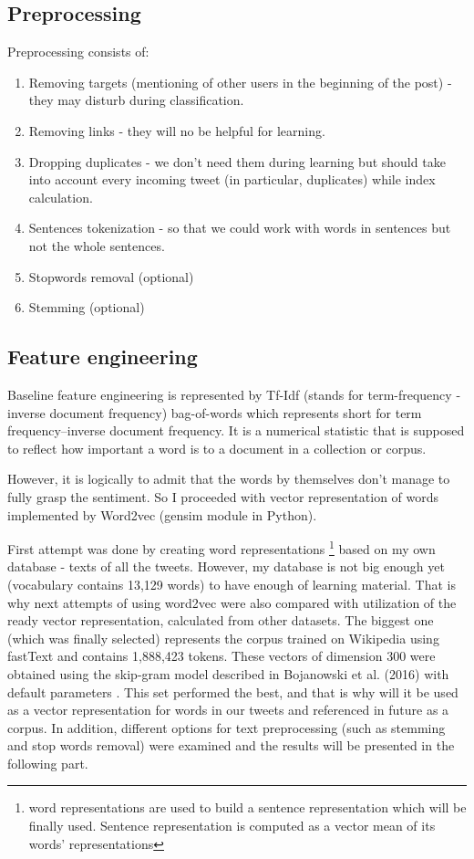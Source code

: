 \documentclass[12pt,a4paper]{article}
\begin{document}
\subsection{Preprocessing}

Preprocessing consists of:
\begin{enumerate}
\item Removing targets (mentioning of other users in the beginning of the post) - they may disturb during classification.
\item Removing links - they will no be helpful for learning.
\item Dropping duplicates - we don't need them during learning but should take into account every incoming tweet (in particular, duplicates) while index calculation.
\item Sentences tokenization - so that we could work with words in sentences but not the whole sentences.
\item Stopwords removal (optional)
\item Stemming (optional)
\end{enumerate}
\newpage

\subsection{Feature engineering}
Baseline feature engineering is represented by Tf-Idf (stands for term-frequency - inverse document frequency) bag-of-words which represents short for term frequency–inverse document frequency. It is a numerical statistic that is supposed to reflect how important a word is to a document in a collection or corpus.

However, it is logically to admit that the words by themselves don't manage to fully grasp the sentiment. So I proceeded with vector representation of words implemented by Word2vec (gensim module in Python).

First attempt was done by creating word representations \footnote{word representations are used to build a sentence representation which will be finally used. Sentence representation is computed as a vector mean of its words' representations} based on my own database - texts of all the tweets.  However, my database is not big enough yet (vocabulary contains 13,129 words) to have enough of learning material. That is why next attempts of using word2vec were also compared with utilization of the ready vector representation, calculated from other datasets. The biggest one (which was finally selected) represents the corpus trained on Wikipedia using fastText and contains 1,888,423 tokens. These vectors of dimension 300 were obtained using the skip-gram model described in Bojanowski et al. (2016) with default parameters \cite{w2v_model_wiki}. This set performed the best, and that is why will it be used as a vector representation for words in our tweets and referenced in future as a corpus. In addition, different options for text preprocessing (such as stemming and stop words removal) were examined and the results will be presented in the following part.
\end{document}
